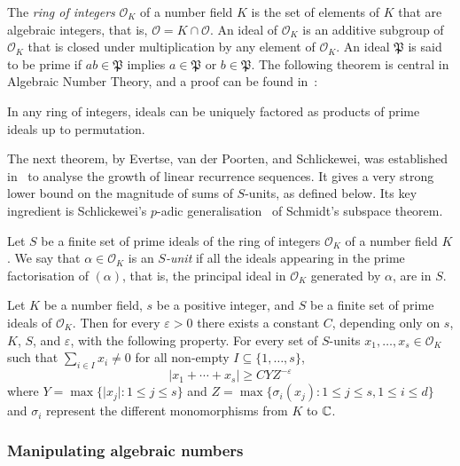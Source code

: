The \emph{ring of integers} $\mathcal{O}_{K}$ of a number field $K$ is the set of elements of $K$ that are algebraic integers, that is, $\mathcal{O}=K\cap\mathcal{O}$.
An ideal of $\mathcal{O}_{K}$ is an additive subgroup of $\mathcal{O}_{K}$ that is closed under multiplication by any element of $\mathcal{O}_{K}$. An ideal $\mathfrak{P}$ is said to be prime if $ab\in \mathfrak{P}$ implies $a\in\mathfrak{P}$ or $b\in\mathfrak{P}$. The following theorem is central in Algebraic Number Theory, and a proof can be found in~\cite{SnT}:

\begin{theorem}
In any ring of integers, ideals can be uniquely factored as products of prime ideals up to permutation.
\end{theorem}

The next theorem, by Evertse, van der Poorten, and Schlickewei, was established in~\cite{Evertse84,PS82} to analyse the growth of linear recurrence sequences. It gives a very strong lower bound on the magnitude of sums of $S$-units, as defined below. Its key ingredient is Schlickewei's $p$-adic generalisation~\cite{Sch77} of Schmidt's subspace theorem.

Let $S$ be a finite set of prime ideals of the ring of integers
$\mathcal{O}_{K}$ of a number field $K$. We say that
$\alpha \in \mathcal{O}_{K}$ is an \emph{$S$-unit} if all the ideals
appearing in the prime factorisation of $(\alpha)$, that is, the principal ideal in $\mathcal{O}_{K}$ generated by $\alpha$, are in $S$.

\begin{theorem}[$S$-units]
\label{thm:s-units}
Let $K$ be a number field, $s$ be a positive integer, and $S$ be a
finite set of prime ideals of $\mathcal{O}_{K}$. Then for every
$\varepsilon>0$ there exists a constant $C$, depending only on $s$,
$K$, $S$, and $\varepsilon$, with the following property. For every
set of $S$-units $x_1,\ldots,x_s\in\mathcal{O}_{K}$ such that
$\sum\limits_{i\in I} x_i\neq 0$ for all non-empty $I\subseteq\lbrace 
1,\ldots,s\rbrace$,
\[ \lvert x_1+\cdots+x_s \rvert\geq CYZ^{-\varepsilon} \]
where $Y=\max\lbrace \lvert x_j\rvert : 1\leq j\leq s \rbrace$ and $Z=\max\lbrace \sigma_i(x_j): 1\leq j\leq s,1\leq i\leq d \rbrace$ and $\sigma_i$ represent the different monomorphisms from $K$ to $\mathbb{C}$.
\end{theorem}

\subsubsection{Manipulating algebraic numbers}
\label{sec:alg_num_rep}

